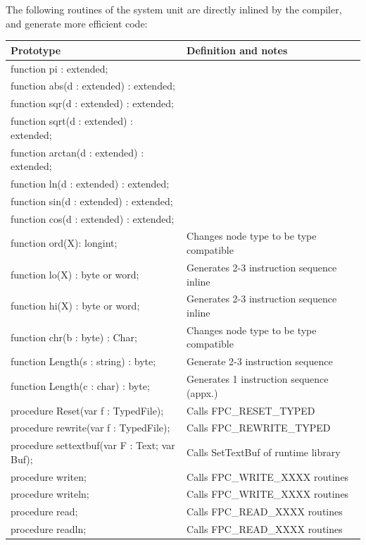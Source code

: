 \documentclass [12pt]{article}
\begin{document}
The following routines of the system unit are directly inlined by the 
compiler, and generate more efficient code:

\begin{longtable}{|l|p{7cm}|}
\hline
Prototype& Definition and notes \\
\hline
\endhead
\hline
\endfoot
\textsf{function pi : extended;}& \\
\textsf{function abs(d : extended) : extended;}& \\
\textsf{function sqr(d : extended) : extended;}& \\
\textsf{function sqrt(d : extended) : extended;}& \\
\textsf{function arctan(d : extended) : extended;}& \\
\textsf{function ln(d : extended) : extended;}& \\
\textsf{function sin(d : extended) : extended;}& \\
\textsf{function cos(d : extended) : extended;}& \\
\textsf{function ord(X): longint;}& 
   Changes node type to be type compatible \\
\textsf{function lo(X) : byte or word;}& 
   Generates 2-3 instruction sequence inline \\
\textsf{function hi(X) : byte or word;}& 
   Generates 2-3 instruction sequence inline \\
\textsf{function chr(b : byte) : Char;}& 
   Changes node type to be type compatible \\
\textsf{function Length(s : string) : byte;}& 
   Generate 2-3 instruction sequence \\
\textsf{function Length(c : char) : byte;}& 
   Generates 1 instruction sequence (appx.) \\
\textsf{procedure Reset(var f : TypedFile);}& 
   Calls FPC{\_}RESET{\_}TYPED \\
\textsf{procedure rewrite(var f : TypedFile);}& 
   Calls FPC{\_}REWRITE{\_}TYPED \\
\textsf{procedure settextbuf(var F : Text; var Buf);}& 
   Calls SetTextBuf of runtime library \\
\textsf{procedure writen;}& 
   Calls FPC{\_}WRITE{\_}XXXX routines \\
\textsf{procedure writeln;}& 
   Calls FPC{\_}WRITE{\_}XXXX routines \\
\textsf{procedure read;}& 
   Calls FPC{\_}READ{\_}XXXX routines \\
\textsf{procedure readln;}& 
   Calls FPC{\_}READ{\_}XXXX routines \\

\end{longtable}
\end{document}
